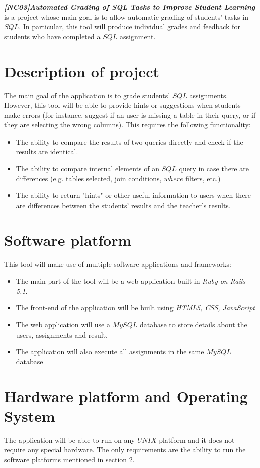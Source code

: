 \textbf{\textit{[NC03]Automated Grading of SQL Tasks to Improve Student Learning}} is a project whose main goal is to allow automatic grading of students' tasks in $SQL$. In particular, this tool will produce individual grades and feedback for students who have completed a $SQL$ assignment.
\section{Description of project} \label{description}
The main goal of the application is to grade students' $SQL$ assignments. However, this tool will be able to provide hints or suggestions when students make errors (for instance, suggest if an user is missing a table in their query, or if they are selecting the wrong columns). This requires the following functionality:
\begin{itemize}
    \item The ability to compare the results of two queries directly and check if the results are identical.
    \item The ability to compare internal elements of an $SQL$ query in case there are differences (e.g. tables selected, join conditions, $where$ filters, etc.)
    \item The ability to return "hints" or other useful information to users when there are differences between the students' results and the teacher's results.
\end{itemize}
\section{Software platform} \label{softwarePlatform}
This tool will make use of multiple software applications and frameworks:
\begin{itemize}
    \item The main part of the tool will be a web application built in \textit{Ruby on Rails 5.1}.
    \item The front-end of the application will be built using \textit{HTML5, CSS, JavaScript}
    \item The web application will use a $MySQL$ database to store details about the users, assignments and result.
    \item The application will also execute all assignments in the same $MySQL$ database
\end{itemize}

\section{Hardware platform and Operating System}
The application will be able to run on any $UNIX$ platform and it does not require any special hardware. The only requirements are the ability to run the software platforms mentioned in section \ref{softwarePlatform}.

